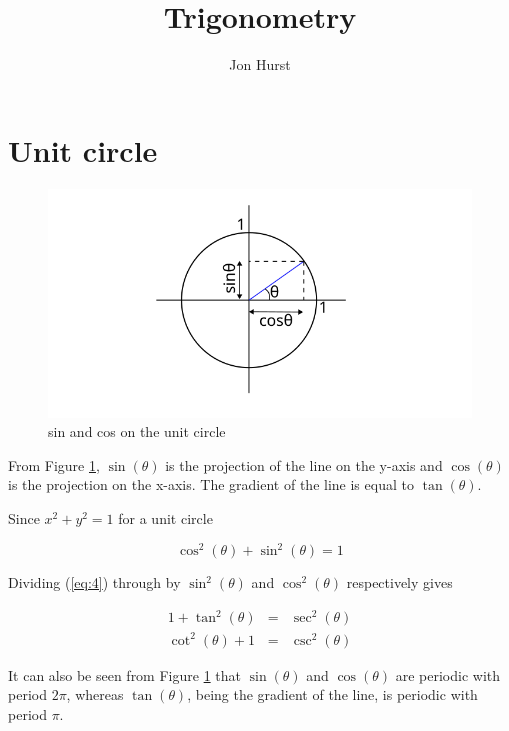 \documentclass[a5paper]{article}
\title{Trigonometry}
\author{Jon Hurst}
\begin{document}
\maketitle
\section{Unit circle}

\begin{figure}[ht]
  \includegraphics{trig-unit-circle}
  \caption{sin and cos on the unit circle}
   \label{fig:1}
\end{figure}

From Figure \ref{fig:1}, $\sin(\theta)$ is the projection of the line on the
y-axis and $\cos(\theta)$ is the projection on the x-axis. The gradient of the
line is equal to $\tan(\theta)$.

Since $x^2 + y^2 = 1$ for a unit circle

\begin{equation} \label{eq:4}
  \cos^2(\theta) + \sin^2(\theta) = 1
\end{equation}

Dividing (\ref{eq:4}) through by $\sin^2(\theta)$ and $\cos^2(\theta)$
respectively gives

\begin{eqnarray}
  1 + \tan^2(\theta)  & = & \sec^2(\theta)\\
  \cot^2(\theta) + 1 & = & \csc^2(\theta)
\end{eqnarray}

It can also be seen from Figure \ref{fig:1} that $\sin(\theta)$ and
$\cos(\theta)$ are periodic with period $2\pi$, whereas $\tan(\theta)$, being
the gradient of the line, is periodic with period $\pi$.
\end{document}
